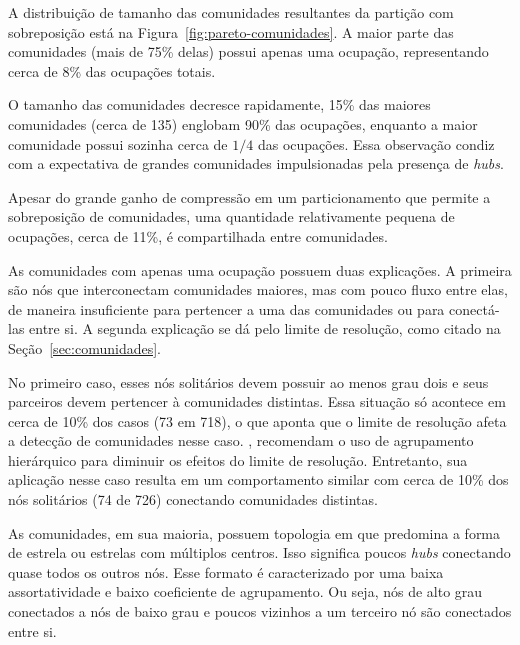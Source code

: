 \documentclass[
  article,
  11pt,
  a4paper,
  english,
  brazil,
  sumario=tradicional]{abntex2}
\begin{document}
A distribuição de tamanho das comunidades resultantes da partição com sobreposição está na Figura~\ref{fig:pareto-comunidades}. A maior parte das comunidades (mais de 75\% delas) possui apenas uma ocupação, representando cerca de 8\% das ocupações totais.

O tamanho das comunidades decresce rapidamente, 15\% das maiores comunidades (cerca de 135) englobam 90\% das ocupações, enquanto a maior comunidade possui sozinha cerca de $1/4$ das ocupações. Essa observação condiz com a expectativa de grandes comunidades impulsionadas pela presença de \textit{hubs}.

Apesar do grande ganho de compressão em um particionamento que permite a sobreposição de comunidades, uma quantidade relativamente pequena de ocupações, cerca de 11\%, é compartilhada entre comunidades.

As comunidades com apenas uma ocupação possuem duas explicações. A primeira são nós que interconectam comunidades maiores, mas com pouco fluxo entre elas, de maneira insuficiente para pertencer a uma das comunidades ou para conectá-las entre si. A segunda explicação se dá pelo limite de resolução, como citado na Seção~\ref{sec:comunidades}.


No primeiro caso, esses nós solitários devem possuir ao menos grau dois e seus parceiros devem pertencer à comunidades distintas. Essa situação só acontece em cerca de 10\% dos casos (73 em 718), o que aponta que o limite de resolução afeta a detecção de comunidades nesse caso. , recomendam o uso de agrupamento hierárquico para diminuir os efeitos do limite de resolução. Entretanto, sua aplicação nesse caso resulta em um comportamento similar com cerca de 10\% dos nós solitários (74 de 726) conectando comunidades distintas.

As comunidades, em sua maioria, possuem topologia em que predomina a forma de estrela ou estrelas com múltiplos centros. Isso significa poucos \textit{hubs} conectando quase todos os outros nós. Esse formato é caracterizado por uma baixa assortatividade e baixo coeficiente de agrupamento. Ou seja, nós de alto grau conectados a nós de baixo grau e poucos vizinhos a um terceiro nó são conectados entre si.

\end{document}
